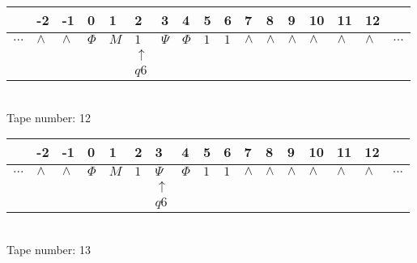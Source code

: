 \documentclass{article}
\begin{document}
\begin{table}[H]
\centering
\begin{tabular}{lllllllllllllllll}
 & -2 & -1 & 0 & 1 & 2 & 3 & 4 & 5 & 6 & 7 & 8 & 9 & 10 & 11 & 12 & \\
\hline
$...$ & \multicolumn{1}{|l|}{$\wedge$} & \multicolumn{1}{|l|}{$\wedge$} & \multicolumn{1}{|l|}{$\Phi$} & \multicolumn{1}{|l|}{$M$} & \multicolumn{1}{|l|}{$1$} & \multicolumn{1}{|l|}{$\Psi$} & \multicolumn{1}{|l|}{$\Phi$} & \multicolumn{1}{|l|}{$1$} & \multicolumn{1}{|l|}{$1$} & \multicolumn{1}{|l|}{$\wedge$} & \multicolumn{1}{|l|}{$\wedge$} & \multicolumn{1}{|l|}{$\wedge$} & \multicolumn{1}{|l|}{$\wedge$} & \multicolumn{1}{|l|}{$\wedge$} & \multicolumn{1}{|l|}{$\wedge$} & $...$\\
\hline
&  &  &  &  & $\uparrow$ &  &  &  &  &  &  &  &  &  &  &  \\
&  &  &  &  & $ q6 $ &  &  &  &  &  &  &  &  &  &  &  \\
\end{tabular}
\\
Tape number: 12
\noindent\makebox[\linewidth]{\hdashrule{\textwidth}{1pt}{1pt}}\end{table}

\begin{table}[H]
\centering
\begin{tabular}{lllllllllllllllll}
 & -2 & -1 & 0 & 1 & 2 & 3 & 4 & 5 & 6 & 7 & 8 & 9 & 10 & 11 & 12 & \\
\hline
$...$ & \multicolumn{1}{|l|}{$\wedge$} & \multicolumn{1}{|l|}{$\wedge$} & \multicolumn{1}{|l|}{$\Phi$} & \multicolumn{1}{|l|}{$M$} & \multicolumn{1}{|l|}{$1$} & \multicolumn{1}{|l|}{$\Psi$} & \multicolumn{1}{|l|}{$\Phi$} & \multicolumn{1}{|l|}{$1$} & \multicolumn{1}{|l|}{$1$} & \multicolumn{1}{|l|}{$\wedge$} & \multicolumn{1}{|l|}{$\wedge$} & \multicolumn{1}{|l|}{$\wedge$} & \multicolumn{1}{|l|}{$\wedge$} & \multicolumn{1}{|l|}{$\wedge$} & \multicolumn{1}{|l|}{$\wedge$} & $...$\\
\hline
&  &  &  &  &  & $\uparrow$ &  &  &  &  &  &  &  &  &  &  \\
&  &  &  &  &  & $ q6 $ &  &  &  &  &  &  &  &  &  &  \\
\end{tabular}
\\
Tape number: 13
\noindent\makebox[\linewidth]{\hdashrule{\textwidth}{1pt}{1pt}}\end{table}
\end{document}
